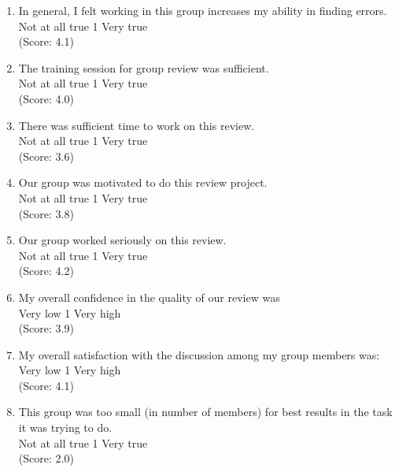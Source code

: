 \begin{enumerate}
\item In general, I felt working in this group increases my ability
in finding errors. 
\\
Not at all true \hfill 1     \hfill Very true\\
(Score: 4.1)

\item The training session for group review was sufficient.
\\
Not at all true \hfill 1     \hfill Very true\\
(Score: 4.0)

\item There was sufficient time to work on this review.
\\
Not at all true \hfill 1     \hfill Very true\\
(Score: 3.6)

\item Our group was motivated to do this review project.
\\
Not at all true \hfill 1     \hfill Very true\\
(Score: 3.8)

\item Our group worked seriously on this review.
\\
Not at all true \hfill 1     \hfill Very true\\
(Score: 4.2)

\item My overall confidence in the quality of our review was
\\
Very low \hfill 1     \hfill Very high\\
(Score: 3.9)

\item My overall satisfaction with the discussion among my group
 members was:
\\
Very low \hfill 1     \hfill Very high\\
(Score: 4.1)

\item This group was too small (in number of members) for best results
in the task it was trying to do.
\\
Not at all true \hfill 1     \hfill Very true\\
(Score: 2.0)


\end{enumerate}
